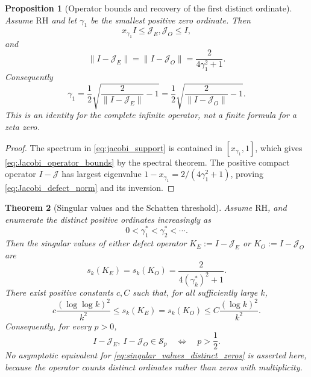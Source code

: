 \documentclass[preprint,12pt]{elsarticle}
\numberwithin{equation}{section}
\theoremstyle{plain}
\newtheorem{theorem}{Theorem}[section]
\newtheorem{proposition}[theorem]{Proposition}
\theoremstyle{definition}
\theoremstyle{remark}
\newcommand{\RH}{\mathrm{RH}}
\begin{document}
\begin{proposition}[Operator bounds and recovery of the first distinct ordinate]
\label{prop:operator_bounds_first_zero}
Assume $\RH$ and let $\gamma_1$ be the smallest positive zero ordinate.  Then
\begin{equation}
x_{\gamma_1}I\le \mathcal J_E,\mathcal J_O\le I,
\label{eq:Jacobi_operator_bounds}
\end{equation}
and
\begin{equation}
\|I-\mathcal J_E\|
=\|I-\mathcal J_O\|
=\frac{2}{4\gamma_1^2+1}.
\label{eq:Jacobi_defect_norm}
\end{equation}
Consequently
\begin{equation}
\gamma_1
=\frac12\sqrt{\frac{2}{\|I-\mathcal J_E\|}-1}
=\frac12\sqrt{\frac{2}{\|I-\mathcal J_O\|}-1}.
\label{eq:first_zero_from_infinite_operator_norm}
\end{equation}
This is an identity for the complete infinite operator, not a finite formula for a zeta zero.
\end{proposition}

\begin{proof}
The spectrum in \eqref{eq:jacobi_support} is contained in $[x_{\gamma_1},1]$, which gives \eqref{eq:Jacobi_operator_bounds} by the spectral theorem.  The positive compact operator $I-\mathcal J$ has largest eigenvalue $1-x_{\gamma_1}=2/(4\gamma_1^2+1)$, proving \eqref{eq:Jacobi_defect_norm} and its inversion.
\end{proof}

\begin{theorem}[Singular values and the Schatten threshold]
\label{thm:Schatten_threshold}
Assume $\RH$, and enumerate the \emph{distinct} positive ordinates increasingly as
\begin{equation}
0<\gamma_1^*<\gamma_2^*<\cdots.
\label{eq:distinct_ordinate_enumeration}
\end{equation}
Then the singular values of either defect operator $K_E:=I-\mathcal J_E$ or $K_O:=I-\mathcal J_O$ are
\begin{equation}
s_k(K_E)=s_k(K_O)
=\frac{2}{4(\gamma_k^*)^2+1}.
\label{eq:singular_values_distinct_zeros}
\end{equation}
There exist positive constants $c,C$ such that, for all sufficiently large $k$,
\begin{equation}
c\frac{(\log\log k)^2}{k^2}
\le s_k(K_E)=s_k(K_O)
\le C\frac{(\log k)^2}{k^2}.
\label{eq:singular_value_two_sided_bounds}
\end{equation}
Consequently, for every $p>0$,
\begin{equation}
I-\mathcal J_E,\ I-\mathcal J_O\in\mathcal S_p
\quad\Longleftrightarrow\quad
p>\frac12.
\label{eq:Schatten_threshold}
\end{equation}
No asymptotic equivalent for \eqref{eq:singular_values_distinct_zeros} is asserted here, because the operator counts distinct ordinates rather than zeros with multiplicity.
\end{theorem}
\end{document}
